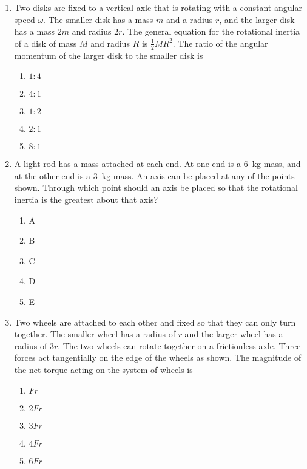 \documentclass{../../oss-apphys}
\begin{document}
\begin{multicols}{2}
\begin{enumerate}[leftmargin=18pt]
  \item Two disks are fixed to a vertical axle that is rotating with a constant
    angular speed $\omega$. The smaller disk has a mass $m$ and a radius $r$,
    and the larger disk has a mass $2m$ and radius $2r$. The general equation
    for the rotational inertia of a disk of mass $M$ and radius $R$ is
    $\frac{1}{2}MR^2$. The ratio of the angular momentum of the larger disk to
    the smaller disk is
    \begin{center}
    \end{center}
    \begin{enumerate}[noitemsep,topsep=0pt,leftmargin=18pt,label=(\Alph*)]
    \item$1:4$
    \item$4:1$
    \item$1:2$
    \item$2:1$
    \item$8:1$
    \end{enumerate}
    \columnbreak
    
  \item A light rod has a mass attached at each end. At one end is a
    \SI{6}{\kilo\gram} mass, and at the other end is a \SI{3}{\kilo\gram} mass.
    An axis can be placed at any of the points shown. Through which point
    should an axis be placed so that the rotational inertia is the greatest
    about that axis?
    \begin{center}
    \end{center}
    \begin{enumerate}[noitemsep,topsep=0pt,leftmargin=18pt,label=(\Alph*)]
    \item A
    \item B
    \item C
    \item D
    \item E
    \end{enumerate}
    
  \item Two wheels are attached to each other and fixed so that they can only
    turn together. The smaller wheel has a radius of $r$ and the larger wheel
    has a radius of $3r$. The two wheels can rotate together on a frictionless
    axle. Three forces act tangentially on the edge of the wheels as shown.
    The magnitude of the net torque acting on the system of wheels is
    \begin{center}
    \end{center}
    \begin{enumerate}[noitemsep,topsep=0pt,leftmargin=18pt,label=(\Alph*)]
    \item$Fr$
    \item$2Fr$
    \item$3Fr$
    \item$4Fr$
    \item$6Fr$
    \end{enumerate}
    \columnbreak
    

\end{enumerate}
\end{multicols}
\end{document}
